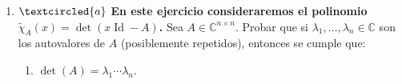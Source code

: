\documentclass[12pt]{amsart}
\begin{document}
\begin{enumerate}[resume]
% 
% 
% 
% 
% 

\

\item\label{complejos} $\textcircled{a}$ {\bf En este ejercicio consideraremos el polinomio $\tilde\chi_A(x)=\det(x\operatorname{Id}-A)$.} Sea $A\in\mathbb{C}^{n\times n}$. Probar que si $\lambda_1,\dots,\lambda_n \in \mathbb C$ son los autovalores de $A$
(posiblemente repetidos), entonces se cumple que:
\begin{multicols}{2}
\begin{enumerate}
	\item $\det(A)=\lambda_1\cdots \lambda_n$.
	

\end{enumerate}
\end{multicols}
\end{enumerate}
\end{document}
